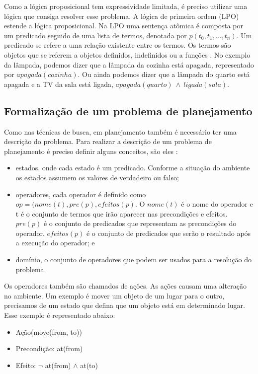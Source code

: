 Como a lógica proposicional tem expressividade limitada, é preciso utilizar uma lógica que consiga resolver esse problema. A lógica de primeira ordem (LPO) estende a lógica proposicional. Na LPO uma sentença atômica é composta por um predicado seguido de uma lista de termos, denotada por $p(t_{0}, t_{1}, ..., t_{n})$. Um predicado se refere a uma relação existente entre os termos. Os termos são objetos que se referem a objetos definidos, indefinidos ou a funções \cite{intelligence2003modern}. No exemplo da lâmpada, podemos dizer que a lâmpada da cozinha está apagada, representado por $apagada(cozinha)$. Ou ainda podemos dizer que a lâmpada do quarto está apagada e a TV da sala está ligada, $apagada(quarto)~ \wedge~ ligada(sala)$.  

\subsection{Formalização de um problema de planejamento}

Como nas técnicas de busca, em planejamento também é necessário ter uma descrição do problema.
Para realizar a descrição de um problema de planejamento é preciso definir alguns conceitos, são eles \cite{intelligence2003modern, ghallab2004automated, meneguzzi2015planning}:

\begin{itemize}
	\item estados, onde cada estado é um predicado. Conforme a situação do ambiente os estados assumem os valores de verdadeiro ou falso;
	\item operadores, cada operador é definido como $op = (nome(t), pre(p), efeitos(p)$. O $nome(t)$ é o nome do operador e t é o conjunto de termos que irão aparecer nas precondições e efeitos. $pre(p)$ é o conjunto de predicados que representam as precondições do operador. $efeitos(p)$ é o conjunto de predicados que serão o resultado após a execução do operador; e
	\item domínio, o conjunto de operadores que podem ser usados para a resolução do problema.
\end{itemize}

Os operadores também são chamados de ações. As ações causam uma alteração no ambiente. Um exemplo é mover um objeto de um lugar para o outro, precisamos de um estado que defina que um objeto está em determinado lugar. Esse exemplo é representado abaixo:

\begin{itemize}
	\item Ação(move(from, to))
	\item Precondição: at(from)
	\item Efeito: $\neg$ at(from) $\wedge$ at(to)
\end{itemize}

